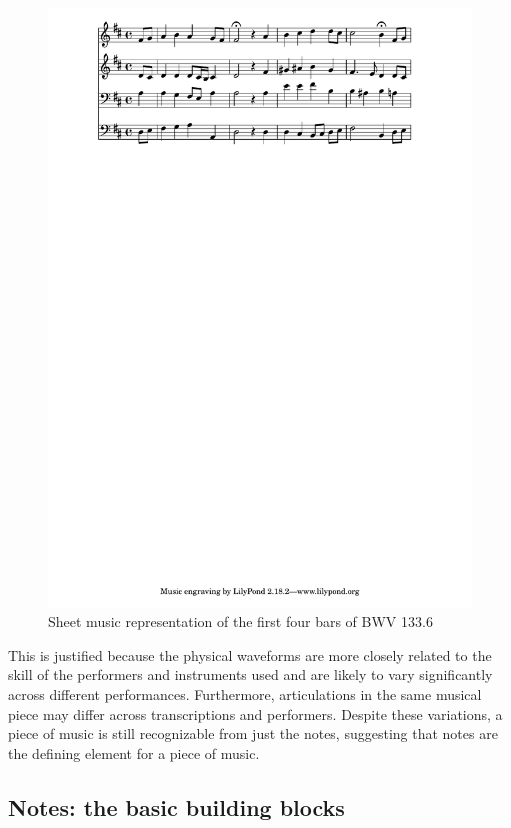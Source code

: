 \begin{figure}[tb]
    \centering
    \includegraphics[trim={0 23cm 0 0},clip,width=1.0\linewidth]{bwv133-6-eg-score.pdf}
    \caption{Sheet music representation of the first four bars of BWV 133.6}
    \label{fig:eg-score}
\end{figure}

This is justified because the physical waveforms are more closely related
to the skill of the performers and instruments used and are likely to vary
significantly across different performances. Furthermore, articulations in
the same musical piece may differ across transcriptions and performers.
Despite these variations, a piece of music is still recognizable from just the
notes, suggesting that notes are the defining element for a piece of music.

\subsection{Notes: the basic building blocks}

